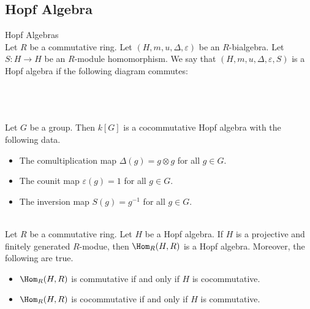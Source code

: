 \documentclass[a4paper]{article}
\begin{document}
\subsection{Hopf Algebra}
\begin{defn}{Hopf Algebras}{}\\
Let $R$ be a commutative ring. Let $(H,m,u,\Delta,\varepsilon)$ be an $R$-bialgebra. Let $S:H\to H$ be an $R$-module homomorphism. We say that $(H,m,u,\Delta,\varepsilon,S)$ is a Hopf algebra if the following diagram commutes: \\~\\
 \\
\end{defn}

\begin{eg}{}{}\\
Let $G$ be a group. Then $k[G]$ is a cocommutative Hopf algebra with the following data. 
\begin{itemize}
\item The comultiplication map $\Delta(g)=g\otimes g$ for all $g\in G$. 
\item The counit map $\varepsilon(g)=1$ for all $g\in G$. 
\item The inversion map $S(g)=g^{-1}$ for all $g\in G$. 
\end{itemize}
\end{eg}

\begin{prp}{}{}\\
Let $R$ be a commutative ring. Let $H$ be a Hopf algebra. If $H$ is a projective and finitely generated $R$-modue, then $\Hom_R(H,R)$ is a Hopf algebra. Moreover, the following are true. 
\begin{itemize}
\item $\Hom_R(H,R)$ is commutative if and only if $H$ is cocommutative. 
\item $\Hom_R(H,R)$ is cocommutative if and only if $H$ is commutative. 
\end{itemize}
\end{prp}
\end{document}
